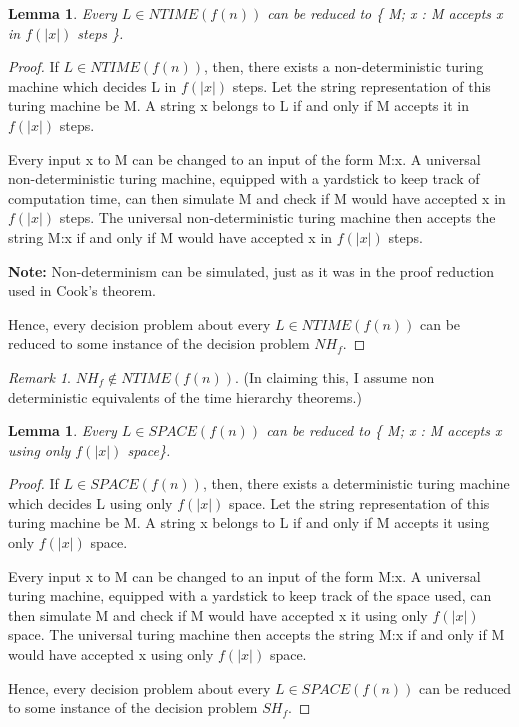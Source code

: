 \documentclass[10pt]{amsart}
\newtheorem{lem}[thm]{Lemma}
\theoremstyle{remark}
\newtheorem{rem}[thm]{Remark}
\begin{document}
\begin{lem}
Every $L \in NTIME(f(n))$ can be reduced to \{ M; x : M accepts x in $f(|x|)$ steps \}.
\end{lem}
\begin{proof}
If $L \in NTIME(f(n))$, then, there exists a non-deterministic turing machine which decides L in $f(|x|)$ steps. Let the string representation of this turing machine be M. A string x belongs to L if and only if M accepts it in $f(|x|)$ steps.

Every input x to M can be changed to an input of the form M:x. A universal non-deterministic turing machine, equipped with a yardstick to keep track of computation time, can then simulate M and check if M would have accepted x in $f(|x|)$ steps. The universal non-deterministic turing machine then accepts the string M:x if and only if M would have accepted x in $f(|x|)$ steps.

\textbf{Note:} Non-determinism can be simulated, just as it was in the proof reduction used in Cook's theorem.

Hence, every decision problem about every $L \in NTIME(f(n))$ can be reduced to some instance of the decision problem $NH_{f}$.
\end{proof}

\begin{rem}
$NH_{f} \notin NTIME(f(n))$. (In claiming this, I assume non deterministic equivalents of the time hierarchy theorems.)
\end{rem}

\begin{lem}
Every $L \in SPACE(f(n))$ can be reduced to \{ M; x : M accepts x using only $f(|x|)$ space\}.
\end{lem}
\begin{proof}
If $L \in SPACE(f(n))$, then, there exists a deterministic turing machine which decides L using only $f(|x|)$ space. Let the string representation of this turing machine be M. A string x belongs to L if and only if M accepts it using only $f(|x|)$ space.

Every input x to M can be changed to an input of the form M:x. A universal turing machine, equipped with a yardstick to keep track of the space used, can then simulate M and check if M would have accepted x it using only $f(|x|) $ space. The universal turing machine then accepts the string M:x if and only if M would have accepted x using only $f(|x|)$ space.

Hence, every decision problem about every $L \in SPACE(f(n))$ can be reduced to some instance of the decision problem $SH_{f}$.

\end{proof}
\end{document}
